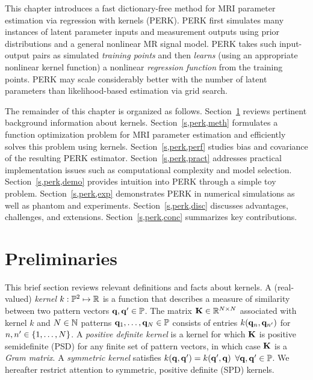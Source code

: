 This chapter introduces  
a fast dictionary-free method
for MRI parameter estimation
via regression with kernels (PERK).
PERK first simulates many instances
of latent parameter inputs
and measurement outputs
using prior distributions
and a general nonlinear MR signal model.
PERK takes such input-output pairs
as simulated \emph{training points}
and then \emph{learns}
(using an appropriate nonlinear kernel function)
a nonlinear \emph{regression function}
from the training points.
PERK may scale considerably better
with the number of latent parameters
than likelihood-based estimation 
via grid search.

The remainder of this chapter
is organized as follows.
Section~\ref{s,perk,rev} reviews 
pertinent background information about kernels. 
Section~\ref{s,perk,meth} formulates 
a function optimization problem
for MRI parameter estimation
and efficiently solves this problem 
using kernels.
Section~\ref{s,perk,perf} studies bias and covariance
of the resulting PERK estimator.
Section~\ref{s,perk,pract} addresses practical implementation issues
such as computational complexity and model selection.
Section~\ref{s,perk,demo} provides intuition into PERK
through a simple toy problem.
Section~\ref{s,perk,exp} demonstrates PERK
in numerical simulations
as well as phantom and \invivo experiments.
Section~\ref{s,perk,disc} discusses advantages,
challenges, and extensions.
Section~\ref{s,perk,conc} summarizes key contributions.

\section{Preliminaries}
\label{s,perk,rev}

This brief section reviews
relevant definitions and facts about kernels.
A (real-valued) \emph{kernel} 
$k : \mathbb{P}^2 \mapsto \mathbb{R}$
is a function 
that describes a measure of similarity
between two pattern vectors 
$\mathbf{q},\mathbf{q}' \in \mathbb{P}$.
The matrix $\mathbf{K} \in \mathbb{R}^{N \times N}$
associated with kernel $k$
and $N \in \mathbb{N}$ patterns $\mathbf{q}_1,\dots,\mathbf{q}_N \in \mathbb{P}$
consists of entries
$k\paren{\bmq_n,\bmq_{n'}}$
for $n,n' \in \set{1,\dots,N}$.
A \emph{positive definite kernel} is a kernel
for which $\mathbf{K}$ is positive semidefinite (PSD)
for any finite set of pattern vectors,
in which case $\mathbf{K}$
is a \emph{Gram matrix}.
A \emph{symmetric kernel} satisfies 
$k\paren{\bmq,\bmq'} = k\paren{\bmq',\bmq}$
$\forall \mathbf{q},\mathbf{q}' \in \mathbb{P}$.
We hereafter restrict attention
to symmetric, positive definite (SPD) kernels.

